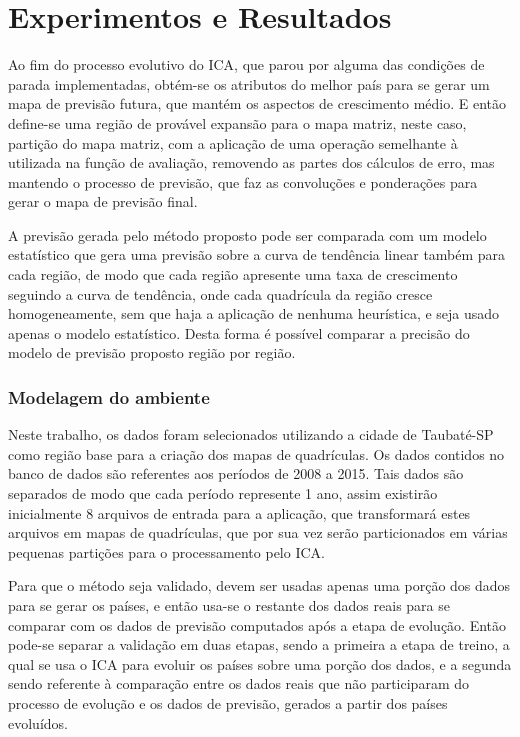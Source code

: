 \chapter{Experimentos e Resultados}
\label{experimentos}

Ao fim do processo evolutivo do ICA, que parou por alguma das condições de parada implementadas, obtém-se os atributos do melhor país para se gerar um mapa de previsão futura, que mantém os aspectos de crescimento médio. E então define-se uma região de provável expansão para o mapa matriz, neste caso, partição do mapa matriz, com a aplicação de uma operação semelhante à utilizada na função de avaliação, removendo as partes dos cálculos de erro, mas mantendo o processo de previsão, que faz as convoluções e ponderações para gerar o mapa de previsão final.

A previsão gerada pelo método proposto pode ser comparada com um modelo estatístico que gera uma previsão sobre a curva de tendência linear também para cada região, de modo que cada região apresente uma taxa de crescimento seguindo a curva de tendência, onde cada quadrícula da região cresce homogeneamente, sem que haja a aplicação de nenhuma heurística, e seja usado apenas o modelo estatístico. Desta forma é possível comparar a precisão do modelo de previsão proposto região por região.

\subsection{Modelagem do ambiente}
\label{Exp:Modelagem do ambiente}

Neste trabalho, os dados foram selecionados utilizando a cidade de Taubaté-SP como região base para a criação dos mapas de quadrículas. Os dados contidos no banco de dados são referentes aos períodos de 2008 a 2015. Tais dados são separados de modo que cada período represente 1 ano, assim existirão inicialmente 8 arquivos de entrada para a aplicação, que transformará estes arquivos em mapas de quadrículas, que por sua vez serão particionados em várias pequenas partições para o processamento pelo ICA. 

Para que o método seja validado, devem ser usadas apenas uma porção dos dados para se gerar os países, e então usa-se o restante dos dados reais para se comparar com os dados de previsão computados após a etapa de evolução. Então pode-se separar a validação em duas etapas, sendo a primeira a etapa de treino, a qual se usa o ICA para evoluir os países sobre uma porção dos dados, e a segunda sendo referente à comparação entre os dados reais que não participaram do processo de evolução e os dados de previsão, gerados a partir dos países evoluídos. 

